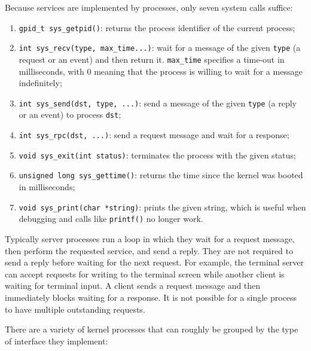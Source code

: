 \documentclass{article}
\begin{document}
Because services are implemented by processes, only seven system calls suffice:

\begin{enumerate}
\item \texttt{gpid\_t sys\_getpid()}: returns the process identifier
of the current process;
\item \texttt{int sys\_recv(type, max\_time...)}: wait for a message of the
given \texttt{type} (a request or an event) and then return it.
\texttt{max\_time} specifies a
time-out in milliseconds, with 0 meaning that the process is willing to
wait for a message indefinitely;
\item \texttt{int sys\_send(dst, type, ...)}: send a message of the
given \texttt{type} (a reply or an event) to process \texttt{dst};
\item \texttt{int sys\_rpc(dst, ...)}: send a request message and wait
for a response;
\item \texttt{void sys\_exit(int status)}: terminates the process with
the given status;
\item \texttt{unsigned long sys\_gettime()}: returns the time since the kernel was
booted in milliseconds;
\item \texttt{void sys\_print(char *string)}: prints the given string, which
is useful when debugging and calls like \texttt{printf()} no longer work.
\end{enumerate}

Typically server processes run a loop in which they wait for a request
message, then perform the requested service, and send a reply.  They
are not required to send a reply before waiting for the next request.
For example, the terminal server can accept requests for writing to
the terminal screen while another client is waiting for terminal input.
A client sends a request message and then immediately blocks
waiting for a response.  It is not possible for a single process to have
multiple outstanding requests.

There are a variety of kernel processes that can roughly be grouped
by the type of interface they implement:
\end{document}
